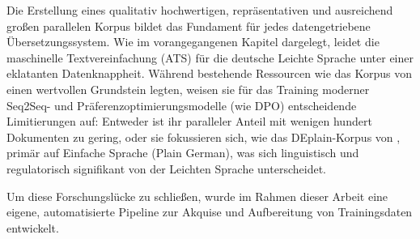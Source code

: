Die Erstellung eines qualitativ hochwertigen, repräsentativen und ausreichend großen parallelen Korpus bildet das Fundament für jedes datengetriebene Übersetzungssystem. Wie im vorangegangenen Kapitel dargelegt, leidet die maschinelle Textvereinfachung (ATS) für die deutsche Leichte Sprache unter einer eklatanten Datenknappheit. Während bestehende Ressourcen wie das Korpus von \citet{battisti2020corpus} einen wertvollen Grundstein legten, weisen sie für das Training moderner Seq2Seq- und Präferenzoptimierungsmodelle (wie DPO) entscheidende Limitierungen auf: Entweder ist ihr paralleler Anteil mit wenigen hundert Dokumenten zu gering, oder sie fokussieren sich, wie das DEplain-Korpus von \citet{stodden2023deplain}, primär auf Einfache Sprache (Plain German), was sich linguistisch und regulatorisch signifikant von der Leichten Sprache unterscheidet. 

Um diese Forschungslücke zu schließen, wurde im Rahmen dieser Arbeit eine eigene, automatisierte Pipeline zur Akquise und Aufbereitung von Trainingsdaten entwickelt. 

